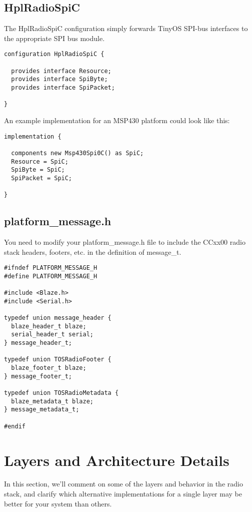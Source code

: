 \documentclass{article}
\begin{document}
\subsection{HplRadioSpiC}
The HplRadioSpiC configuration simply forwards TinyOS SPI-bus interfaces to the 
appropriate SPI bus module.

\begin{verbatim}
configuration HplRadioSpiC {
  
  provides interface Resource;
  provides interface SpiByte;
  provides interface SpiPacket;
  
}
\end{verbatim}

An example implementation for an MSP430 platform could look like this:

\begin{verbatim}
implementation {

  components new Msp430Spi0C() as SpiC;
  Resource = SpiC;
  SpiByte = SpiC;
  SpiPacket = SpiC;

}
\end{verbatim}


\subsection{platform\_message.h}

You need to modify your platform\_message.h file to include the CCxx00 radio stack headers,
footers, etc. in the definition of message\_t.

\begin{verbatim}
#ifndef PLATFORM_MESSAGE_H
#define PLATFORM_MESSAGE_H

#include <Blaze.h>
#include <Serial.h>

typedef union message_header {
  blaze_header_t blaze;
  serial_header_t serial;
} message_header_t;

typedef union TOSRadioFooter {
  blaze_footer_t blaze;
} message_footer_t;

typedef union TOSRadioMetadata {
  blaze_metadata_t blaze;
} message_metadata_t;

#endif
\end{verbatim}


\section{Layers and Architecture Details}
\label{sec:layersandarchitecturedetails}
In this section, we'll comment on some of the layers and behavior in the radio stack,
and clarify which alternative implementations for a single layer may be better for your
system than others.
\end{document}
